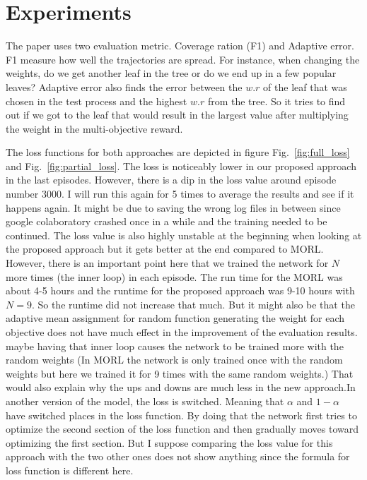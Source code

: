 \documentclass[11pt,onecolumn]{IEEEtran}
\begin{document}
\section*{\centering\textbf{Experiments}}

The paper uses two evaluation metric. Coverage ration (F1) and Adaptive error. F1 measure how well the trajectories are spread. For instance, when changing the weights, do we get another leaf in the tree or do we end up in a few popular leaves? Adaptive error also finds the error between the $w.r$ of the leaf that was chosen in the test process and the highest $w.r$ from the tree. So it tries to find out if we got to the leaf that would result in the largest value after multiplying the weight in the multi-objective reward. 

The loss functions for both approaches are depicted in figure Fig.~\ref{fig:full_loss} and Fig.~\ref{fig:partial_loss}. The loss is noticeably lower in our proposed approach in the last episodes. However, there is a dip in the loss value around episode number 3000. I will run this again for 5 times to average the results and see if it happens again. It might be due to saving the wrong log files in between since google colaboratory crashed once in a while and the training needed to be continued. The loss value is also highly unstable at the beginning when looking at the proposed approach but it gets better at the end compared to MORL. However, there is an important point here that we trained the network for $N$ more times (the inner loop) in each episode. The run time for the MORL was about 4-5 hours and the runtime for the proposed approach was 9-10 hours with $N=9$. So the runtime did not increase that much. But it might also be that the adaptive mean assignment for random function generating the weight for each objective does not have much effect in the improvement of the evaluation results. maybe having that inner loop causes the network to be trained more with the random weights (In MORL the network is only trained once with the random weights but here we trained it for 9 times with the same random weights.) That would also explain why the ups and downs are much less in the new approach.In another version of the model, the loss is switched. Meaning that $\alpha$ and $1-\alpha$ have switched places in the loss function. By doing that the network first tries to optimize the second section of the loss function and then gradually moves toward optimizing the first section. But I suppose comparing the loss value for this approach with the two other ones does not show anything since the formula for loss function is different here.
\end{document}
